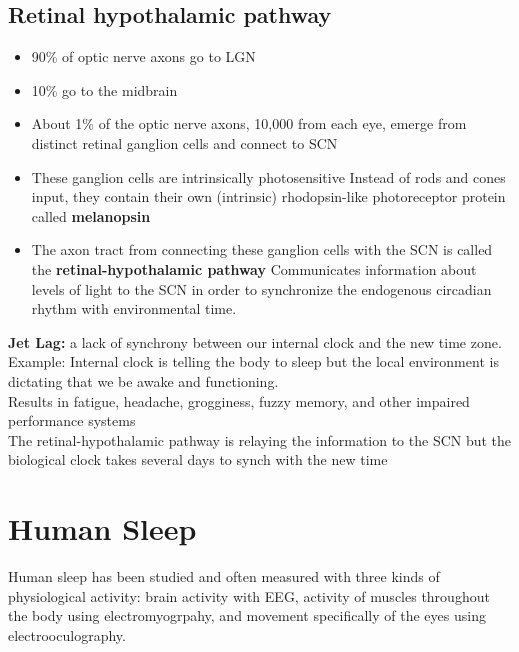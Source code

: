 \documentclass{article}
\begin{document}
\subsection{Retinal hypothalamic pathway}
\begin{itemize}
    \item 90\% of optic nerve axons go to LGN
    \item 10\% go to the midbrain
    \item About 1\% of the optic nerve axons, 10,000 from each eye, emerge from distinct retinal ganglion cells and connect to SCN
    \item These ganglion cells are intrinsically photosensitive
        \subitem Instead of rods and cones input, they contain their own (intrinsic) rhodopsin-like photoreceptor protein called \textbf{melanopsin}
    \item The axon tract from connecting these ganglion cells with the SCN is called the \textbf{retinal-hypothalamic pathway}
        \subitem Communicates information about levels of light to the SCN in order to synchronize the endogenous circadian rhythm with environmental time. 
\end{itemize}

\noindent \textbf{Jet Lag:} a lack of synchrony between our internal clock and the new time zone. \\
Example: Internal clock is telling the body to sleep but the local environment is dictating that we be awake and functioning. \\ 
Results in fatigue, headache, grogginess, fuzzy memory, and other impaired performance systems \\

The retinal-hypothalamic pathway is relaying the information to the SCN but the biological clock takes several days to synch with the new time

\newpage
\section{Human Sleep}
Human sleep has been studied and often measured with three kinds of physiological activity: brain activity with EEG, activity of muscles throughout the body using electromyogrpahy, and movement specifically of the eyes using electrooculography. 
\end{document}
